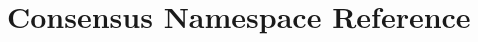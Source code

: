 \hypertarget{namespace_consensus}{}\section{Consensus Namespace Reference}
\label{namespace_consensus}
